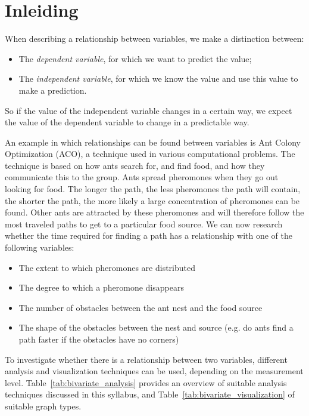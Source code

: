 \section{Inleiding}
\label{sec:analyse2var-inleiding}

When describing a relationship between variables, we make a distinction between:

\begin{itemize}
    \item The \emph{dependent variable}, for which we want to predict the value;
    \item The \emph{independent variable}, for which we know the value and use this value to make a prediction.
\end{itemize}

So if the value of the independent variable changes in a certain way, we expect the value of the dependent variable to change in a predictable way.

\begin{example}
    An example in which relationships can be found between variables is Ant Colony Optimization (ACO), a technique used in various computational problems. The technique is based on how ants search for, and find food, and how they communicate this to the group. Ants spread pheromones when they go out looking for food. The longer the path, the less pheromones the path will contain, the shorter the path, the more likely a large concentration of pheromones can be found. Other ants are attracted by these pheromones and will therefore follow the most traveled paths to get to a particular food source. We can now research whether the time required for finding a path has a relationship with one of the following variables:
    
    \begin{itemize}
        \item The extent to which pheromones are distributed
        \item The degree to which a pheromone disappears
        \item The number of obstacles between the ant nest and the food source
        \item The shape of the obstacles between the nest and source (e.g. do ants find a path faster if the obstacles have no corners)
    \end{itemize}
\end{example}

To investigate whether there is a relationship between two variables, different analysis and visualization techniques can be used, depending on the measurement level. Table~\ref{tab:bivariate_analysis} provides an overview of suitable analysis techniques discussed in this syllabus, and Table~\ref{tab:bivariate_visualization} of suitable graph types.

